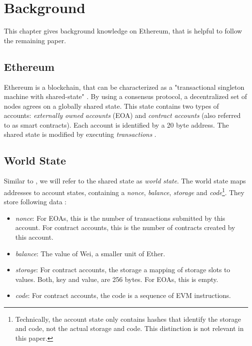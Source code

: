 \documentclass[draft,final]{vutinfth} %
\begin{document}
\chapter{Background}

This chapter gives background knowledge on Ethereum, that is helpful to follow the remaining paper.

\section{Ethereum}

Ethereum is a blockchain, that can be characterized as a "transactional singleton machine with shared-state" \cite{wood_ethereum_2024}. By using a consensus protocol, a decentralized set of nodes agrees on a globally shared state. This state contains two types of accounts: \emph{externally owned accounts} (EOA) and \emph{contract accounts} (also referred to as smart contracts). Each account is identified by a 20 byte address. The shared state is modified by executing \emph{transactions} \cite{tikhomirov_ethereum_2018}.

\section{World State}

Similar to \cite{wood_ethereum_2024}, we will refer to the shared state as \emph{world state}. The world state maps addresses to account states, containing a \emph{nonce}, \emph{balance}, \emph{storage} and \emph{code}\footnote{Technically, the account state only contains hashes that identify the storage and code, not the actual storage and code. This distinction is not relevant in this paper.}. They store following data \cite{wood_ethereum_2024}:

\begin{itemize}
    \item \emph{nonce}: For EOAs, this is the number of transactions submitted by this account. For contract accounts, this is the number of contracts created by this account.
    \item \emph{balance}: The value of Wei, a smaller unit of Ether.
    \item \emph{storage}: For contract accounts, the storage a mapping of storage slots to values. Both, key and value, are 256 bytes. For EOAs, this is empty.
    \item \emph{code}: For contract accounts, the code is a sequence of EVM instructions.
\end{itemize}
\end{document}

